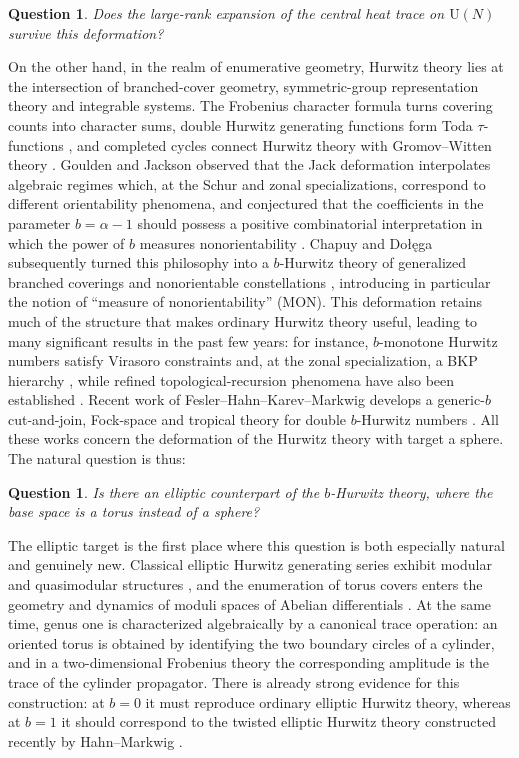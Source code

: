 \documentclass[11pt,a4paper,reqno]{article}
\newtheorem{question}[theorem]{Question}
\theoremstyle{definition}
\theoremstyle{remark}
\newcommand\U{{\mathrm U}}
\begin{document}
\begin{question}\label{ques:spectral}
Does the large-rank expansion of the central heat trace on $\U(N)$ survive this deformation?
\end{question}

On the other hand, in the realm of enumerative geometry, Hurwitz theory lies at the intersection of branched-cover geometry, symmetric-group representation theory and integrable systems. The Frobenius character formula turns covering counts into character sums, double Hurwitz generating functions form Toda $\tau$-functions \cite{Okounkov00}, and completed cycles connect Hurwitz theory with Gromov--Witten theory \cite{OkounkovPandharipande06}. Goulden and Jackson observed that the Jack deformation interpolates algebraic regimes which, at the Schur and zonal specializations, correspond to different orientability phenomena, and conjectured that the coefficients in the parameter $b=\alpha-1$ should possess a positive combinatorial interpretation in which the power of $b$ measures nonorientability \cite{GouldenJackson96}.  Chapuy and Do\l\k{e}ga subsequently turned this philosophy into a $b$-Hurwitz theory of generalized branched coverings and nonorientable constellations \cite{ChapuyDolega22}, introducing in particular the notion of ``measure of nonorientability'' (MON). This deformation retains much of the structure that makes ordinary Hurwitz theory useful, leading to many significant results in the past few years: for instance, $b$-monotone Hurwitz numbers satisfy Virasoro constraints and, at the zonal specialization, a BKP hierarchy \cite{BonzomChapuyDolega23}, while refined topological-recursion phenomena have also been established \cite{ChidambaramDolegaOsuga26}.  Recent work of Fesler--Hahn--Karev--Markwig develops a generic-$b$ cut-and-join, Fock-space and tropical theory for double $b$-Hurwitz numbers \cite{FeslerHahnKarevMarkwig25}. All these works concern the deformation of the Hurwitz theory with target a sphere. The natural question is thus:

\begin{question}\label{ques:enumerative}
Is there an elliptic counterpart of the $b$-Hurwitz theory, where the base space is a torus instead of a sphere?
\end{question}

The elliptic target is the first place where this question is both especially natural and genuinely new. Classical elliptic Hurwitz generating series exhibit modular and quasimodular structures \cite{Dijkgraaf95,BlochOkounkov00,HahnIttersumLeid22}, and the enumeration of torus covers enters the geometry and dynamics of moduli spaces of Abelian differentials \cite{EskinOkounkov01}.  At the same time, genus one is characterized algebraically by a canonical trace operation: an oriented torus is obtained by identifying the two boundary circles of a cylinder, and in a two-dimensional Frobenius theory the corresponding amplitude is the trace of the cylinder propagator. There is already strong evidence for this construction: at $b=0$ it must reproduce ordinary elliptic Hurwitz theory, whereas at $b=1$ it should correspond to the twisted elliptic Hurwitz theory constructed recently by Hahn--Markwig \cite{HahnMarkwig26}.
\end{document}
